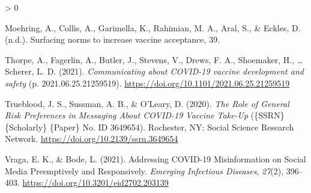 \documentclass[
  english,
  ,jou,floatsintext]{apa6}
\newlength{\cslhangindent}
\newenvironment{CSLReferences}[2] %
 {%
  \setlength{\parindent}{0pt}
  \ifodd #1 \everypar{\setlength{\hangindent}{\cslhangindent}}\ignorespaces\fi
  \ifnum #2 > 0
  \setlength{\parskip}{#2\baselineskip}
  \fi
 }%
 {}
\begin{document}
\begin{CSLReferences}{1}{0}
\leavevmode\hypertarget{ref-moehring_surfacing_nodate}{}%
Moehring, A., Collis, A., Garimella, K., Rahimian, M. A., Aral, S., \& Eckles, D. (n.d.). Surfacing norms to increase vaccine acceptance, 39.

\leavevmode\hypertarget{ref-thorpe_communicating_2021}{}%
Thorpe, A., Fagerlin, A., Butler, J., Stevens, V., Drews, F. A., Shoemaker, H., \ldots{} Scherer, L. D. (2021). \emph{Communicating about {COVID}-19 vaccine development and safety} (p. 2021.06.25.21259519). \url{https://doi.org/10.1101/2021.06.25.21259519}

\leavevmode\hypertarget{ref-trueblood_role_2020}{}%
Trueblood, J. S., Sussman, A. B., \& O'Leary, D. (2020). \emph{The {Role} of {General} {Risk} {Preferences} in {Messaging} {About} {COVID}-19 {Vaccine} {Take}-{Up}} (\{SSRN\} \{Scholarly\} \{Paper\} No. ID 3649654). Rochester, NY: Social Science Research Network. \url{https://doi.org/10.2139/ssrn.3649654}

\leavevmode\hypertarget{ref-vraga_addressing_2021}{}%
Vraga, E. K., \& Bode, L. (2021). Addressing {COVID}-19 {Misinformation} on {Social} {Media} {Preemptively} and {Responsively}. \emph{Emerging Infectious Diseases}, \emph{27}(2), 396--403. \url{https://doi.org/10.3201/eid2702.203139}

\end{CSLReferences}
\end{document}
